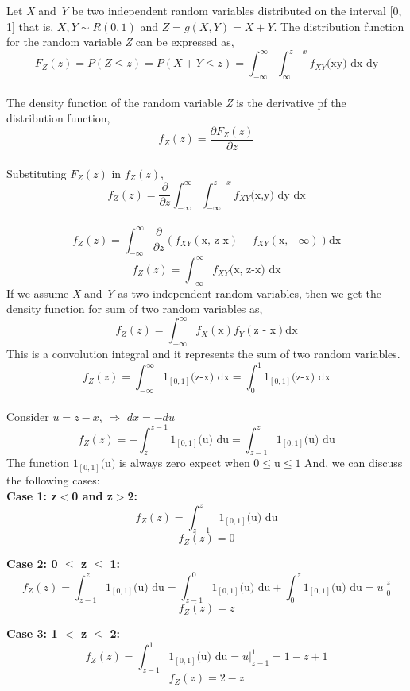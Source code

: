\noindent Let \textit{X} and \textit{Y} be two independent random variables distributed on the interval [0, 1] that is, $X, Y \sim R(0,1)$ and $Z = g(X, Y) = X+Y$. The distribution function for the random variable \textit{Z} can be expressed as,
$$F_Z(z) = P(Z \leq z) = P(X+Y \leq z) = \int_{-\infty}^{\infty}\int_{\infty}^{z-x} f_{XY}\text{(xy) dx dy}$$\\
\noindent The density function of the random variable \textit{Z} is the derivative pf the distribution function,
$$f_Z(z)=\frac{\partial F_Z(z)}{\partial z}$$\\
\noindent Substituting $F_Z(z)$ in $f_Z(z)$,
$$f_Z(z) = \frac{\partial}{\partial z}\int_{-\infty}^{\infty}\int_{-\infty}^{z-x}f_{XY}\text{(x,y) dy dx}$$\\
$$f_Z(z) = \int_{-\infty}^{\infty}\frac{\partial}{\partial z}\left(f_{XY}(\text{x, z-x}) - f_{XY}(\text{x},-\infty)\right)\text{dx}$$
$$f_Z(z) =\int_{-\infty}^{\infty}f_{XY}(\text{x, z-x) dx}$$
\noindent If we assume \textit{X} and \textit{Y} as two independent random variables, then we get the density function for sum of two random variables as,
$$f_Z(z) =\int_{-\infty}^{\infty}f_X(\text{x}) f_Y(\text{z - x}) \text{dx} $$ 
\noindent This is a convolution integral and it represents the sum of two random variables.
$$f_Z(z) = \int_{-\infty}^{\infty}1_{[0,1]}\text{(z-x) dx} = \int_0^1 1_{[0,1]}\text{(z-x) dx}$$\\
\noindent Consider $ u = z - x $, $\Rightarrow$ $ dx = -du $
$$f_Z(z) = -\int_z^{z-1}1_{[0,1]}\text{(u) du} = \int_{z-1}^{z}1_{[0,1]}\text{(u) du}$$ 
\noindent The function $1_{[0,1]}\text{(u)}$ is always zero expect when $0 \leq \text{u} \leq 1$ And, we can discuss the following cases:\\
\textbf{Case 1:   z$<$0 and z$>$2:}
$$f_Z(z)= \int_{z-1}^z 1_{[0,1]}\text{(u) du}$$
$$f_Z(z) = 0$$

\textbf{Case 2: 0 $\leq$ z $\leq$ 1:}
$$f_Z(z) = \int_{z-1}^z 1_{[0,1]}\text{(u) du} = \int_{z-1}^0 1_{[0,1]}\text{(u) du} + \int_0^z 1_{[0,1]}\text{(u) du} = \left .u\right|_0^z$$
$$f_Z(z) = z$$

\textbf{Case 3: 1 $<$ z $\leq$ 2:}
$$f_Z(z) = \int_{z-1}^1 1_{[0,1]}\text{(u) du} = \left.u\right|_{z-1}^1 =1 - z +1 $$
$$f_Z(z) = 2 - z$$

